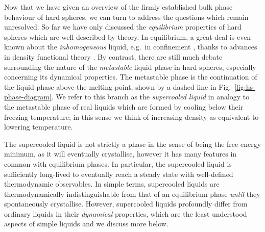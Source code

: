 \documentclass[11pt,twoside]{report}
\begin{document}
Now that we have given an overview of the firmly established bulk phase behaviour of hard spheres, we can turn to address the questions which remain unresolved.
So far we have only discussed the \emph{equilibrium} properties of hard spheres which are well-described by theory.
In equilibrium, a great deal is even known about the \emph{inhomogeneous} liquid, e.g.\ in confinement \cite{GonzalezJCP1998}, thanks to advances in density functional theory \cite{RosenfeldPRL1989,RothJPCM2010}.
By contrast, there are still much debate surrounding the nature of the \emph{metastable} liquid phase in hard spheres, especially concerning its dynamical properties.
The metastable phase is the continuation of the liquid phase above the melting point, shown by a dashed line in Fig.\ \ref{fig:hs-phase-diagram}.
We refer to this branch as the \emph{supercooled liquid} in analogy to the metastable phase of real liquids which are formed by cooling below their freezing temperature; in this sense we think of increasing density as equivalent to lowering temperature.

The supercooled liquid is not strictly a phase in the sense of being the free energy minimum, as it will eventually crystallise, however it has many features in common with equilibrium phases.
In particular, the supercooled liquid is sufficiently long-lived to eventually reach a steady state with well-defined thermodynamic observables.
In simple terms, supercooled liquids are thermodynamically indistinguishable from that of an equilibrium phase \emph{until} they spontaneously crystallise.
However, supercooled liquids profoundly differ from ordinary liquids in their \emph{dynamical} properties, which are the least understood aspects of simple liquids and we discuss more below.
\end{document}
